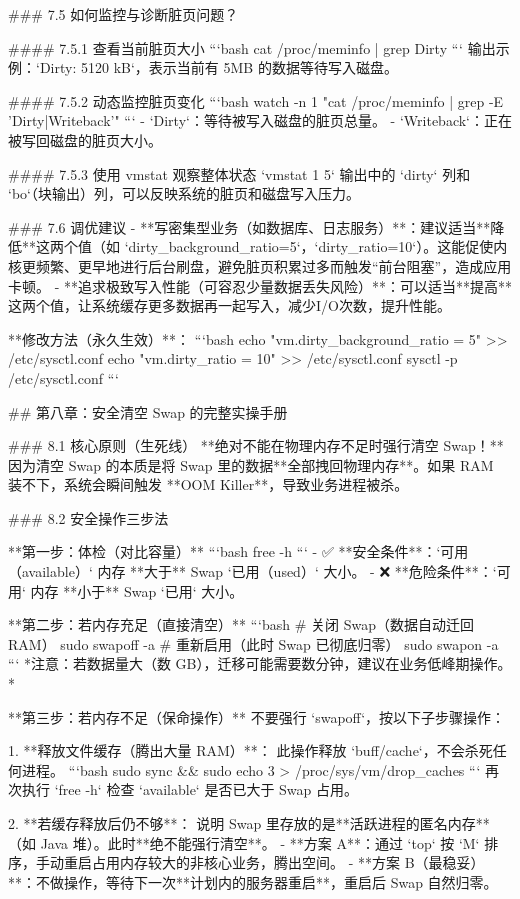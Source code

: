 ### 7.5 如何监控与诊断脏页问题？

#### 7.5.1 查看当前脏页大小
```bash
cat /proc/meminfo | grep Dirty
```
输出示例：`Dirty: 5120 kB`，表示当前有 5MB 的数据等待写入磁盘。

#### 7.5.2 动态监控脏页变化
```bash
watch -n 1 "cat /proc/meminfo | grep -E 'Dirty|Writeback'"
```
-   `Dirty`：等待被写入磁盘的脏页总量。
-   `Writeback`：正在被写回磁盘的脏页大小。

#### 7.5.3 使用 vmstat 观察整体状态
`vmstat 1 5` 输出中的 `dirty` 列和 `bo`（块输出）列，可以反映系统的脏页和磁盘写入压力。

### 7.6 调优建议
-   **写密集型业务（如数据库、日志服务）**：建议适当**降低**这两个值（如 `dirty_background_ratio=5`，`dirty_ratio=10`）。这能促使内核更频繁、更早地进行后台刷盘，避免脏页积累过多而触发“前台阻塞”，造成应用卡顿。
-   **追求极致写入性能（可容忍少量数据丢失风险）**：可以适当**提高**这两个值，让系统缓存更多数据再一起写入，减少I/O次数，提升性能。

**修改方法（永久生效）**：
```bash
echo "vm.dirty_background_ratio = 5" >> /etc/sysctl.conf
echo "vm.dirty_ratio = 10" >> /etc/sysctl.conf
sysctl -p /etc/sysctl.conf
```


## 第八章：安全清空 Swap 的完整实操手册

### 8.1 核心原则（生死线）
**绝对不能在物理内存不足时强行清空 Swap！** 因为清空 Swap 的本质是将 Swap 里的数据**全部拽回物理内存**。如果 RAM 装不下，系统会瞬间触发 **OOM Killer**，导致业务进程被杀。

### 8.2 安全操作三步法

**第一步：体检（对比容量）**
```bash
free -h
```
-   ✅ **安全条件**：`可用（available）` 内存 **大于** Swap `已用（used）` 大小。
-   ❌ **危险条件**：`可用` 内存 **小于** Swap `已用` 大小。

**第二步：若内存充足（直接清空）**
```bash
# 关闭 Swap（数据自动迁回 RAM）
sudo swapoff -a
# 重新启用（此时 Swap 已彻底归零）
sudo swapon -a
```
*注意：若数据量大（数 GB），迁移可能需要数分钟，建议在业务低峰期操作。*

**第三步：若内存不足（保命操作）**
不要强行 `swapoff`，按以下子步骤操作：

1.  **释放文件缓存（腾出大量 RAM）**：
    此操作释放 `buff/cache`，不会杀死任何进程。
    ```bash
    sudo sync && sudo echo 3 > /proc/sys/vm/drop_caches
    ```
    再次执行 `free -h` 检查 `available` 是否已大于 Swap 占用。

2.  **若缓存释放后仍不够**：
    说明 Swap 里存放的是**活跃进程的匿名内存**（如 Java 堆）。此时**绝不能强行清空**。
    -   **方案 A**：通过 `top` 按 `M` 排序，手动重启占用内存较大的非核心业务，腾出空间。
    -   **方案 B（最稳妥）**：不做操作，等待下一次**计划内的服务器重启**，重启后 Swap 自然归零。

